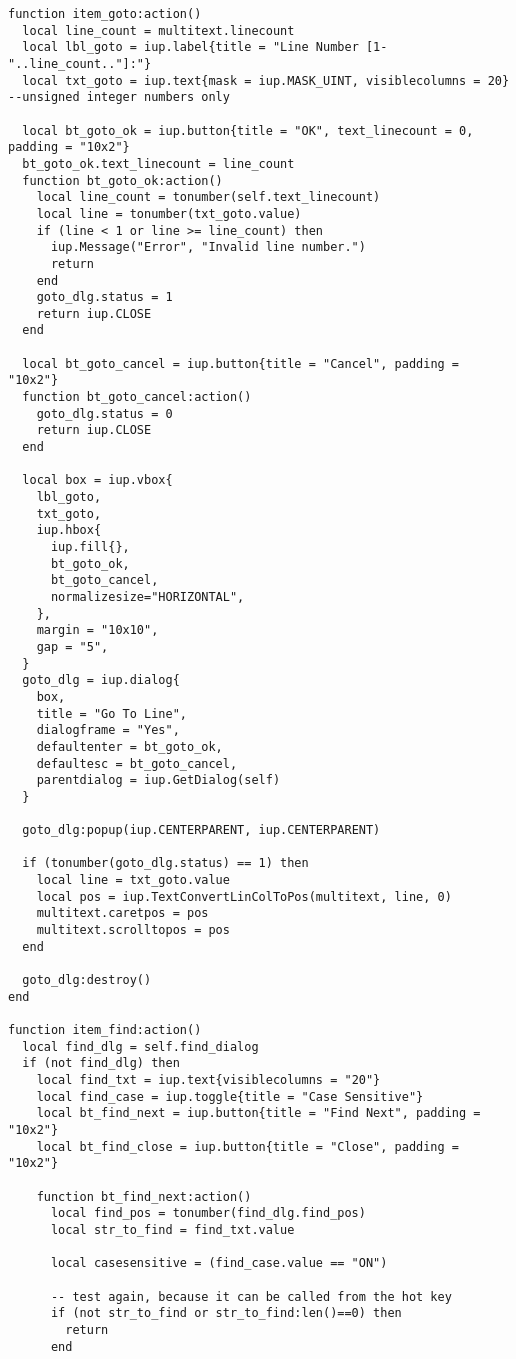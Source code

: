 \documentclass{ctexart}
\begin{document}
\begin{lstlisting}
function item_goto:action()
  local line_count = multitext.linecount
  local lbl_goto = iup.label{title = "Line Number [1-"..line_count.."]:"}
  local txt_goto = iup.text{mask = iup.MASK_UINT, visiblecolumns = 20} --unsigned integer numbers only

  local bt_goto_ok = iup.button{title = "OK", text_linecount = 0, padding = "10x2"} 
  bt_goto_ok.text_linecount = line_count
  function bt_goto_ok:action()
    local line_count = tonumber(self.text_linecount)
    local line = tonumber(txt_goto.value)
    if (line < 1 or line >= line_count) then
      iup.Message("Error", "Invalid line number.")
      return
    end
    goto_dlg.status = 1
    return iup.CLOSE
  end

  local bt_goto_cancel = iup.button{title = "Cancel", padding = "10x2"}
  function bt_goto_cancel:action()
    goto_dlg.status = 0
    return iup.CLOSE
  end

  local box = iup.vbox{
    lbl_goto,
    txt_goto,
    iup.hbox{
      iup.fill{},
      bt_goto_ok,
      bt_goto_cancel,
      normalizesize="HORIZONTAL", 
    },
    margin = "10x10", 
    gap = "5",
  }
  goto_dlg = iup.dialog{
    box,
    title = "Go To Line", 
    dialogframe = "Yes", 
    defaultenter = bt_goto_ok, 
    defaultesc = bt_goto_cancel,
    parentdialog = iup.GetDialog(self)
  }

  goto_dlg:popup(iup.CENTERPARENT, iup.CENTERPARENT)

  if (tonumber(goto_dlg.status) == 1) then
    local line = txt_goto.value
    local pos = iup.TextConvertLinColToPos(multitext, line, 0)
    multitext.caretpos = pos
    multitext.scrolltopos = pos
  end

  goto_dlg:destroy()
end

function item_find:action()
  local find_dlg = self.find_dialog
  if (not find_dlg) then
    local find_txt = iup.text{visiblecolumns = "20"}
    local find_case = iup.toggle{title = "Case Sensitive"}
    local bt_find_next = iup.button{title = "Find Next", padding = "10x2"}
    local bt_find_close = iup.button{title = "Close", padding = "10x2"}

    function bt_find_next:action()
      local find_pos = tonumber(find_dlg.find_pos)
      local str_to_find = find_txt.value

      local casesensitive = (find_case.value == "ON")

      -- test again, because it can be called from the hot key
      if (not str_to_find or str_to_find:len()==0) then
        return
      end


\end{lstlisting}
\end{document}
